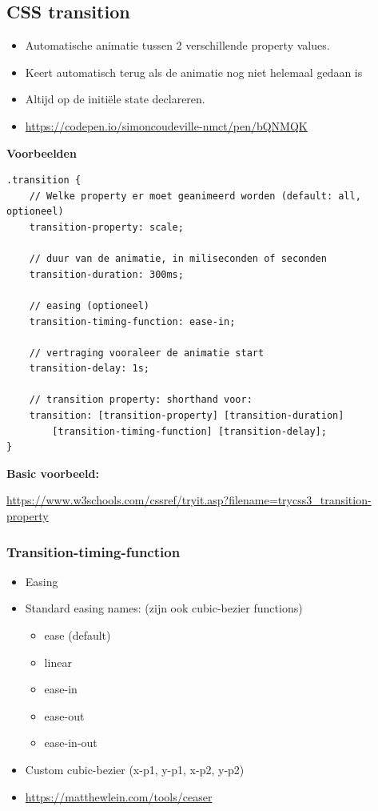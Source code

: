 \documentclass{article}
\newcommand{\bold}[1]{\textbf{#1}}
\begin{document}
\subsection{CSS transition}
\begin{itemize}
    \item Automatische animatie tussen 2 verschillende property values.
    \item Keert automatisch terug als de animatie nog niet helemaal gedaan is
    \item Altijd op de initiële state declareren.
    \item \url{https://codepen.io/simoncoudeville-nmct/pen/bQNMQK}
\end{itemize}

\bold{Voorbeelden}

\begin{verbatim}
.transition {
    // Welke property er moet geanimeerd worden (default: all, optioneel)
    transition-property: scale;

    // duur van de animatie, in miliseconden of seconden
    transition-duration: 300ms;

    // easing (optioneel)
    transition-timing-function: ease-in;

    // vertraging vooraleer de animatie start
    transition-delay: 1s;

    // transition property: shorthand voor:
    transition: [transition-property] [transition-duration] 
        [transition-timing-function] [transition-delay];
}
\end{verbatim}

\bold{Basic voorbeeld:}

\url{https://www.w3schools.com/cssref/tryit.asp?filename=trycss3_transition-property}

\subsubsection{Transition-timing-function}

\begin{itemize}
    \item Easing
    \item Standard easing names: (zijn ook cubic-bezier functions)
    \begin{itemize}
        \item ease (default)
        \item linear
        \item ease-in
        \item ease-out
        \item ease-in-out
    \end{itemize}
    \item Custom cubic-bezier (x-p1, y-p1, x-p2, y-p2)
    \item \url{https://matthewlein.com/tools/ceaser}
\end{itemize}
\end{document}

